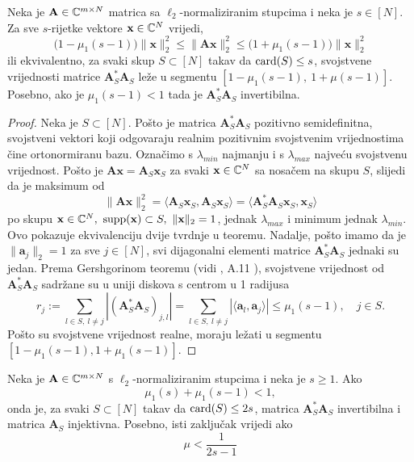 \documentclass[a4paper,twoside,12pt]{memoir} %
\newcommand{\vect}[1]{\mathbf{#1}}
\renewcommand{\vec}{\vect}
\newcommand{\card}{\text{\normalfont{card}}}
\newcommand{\supp}{\text{\normalfont{supp}}}
\newcommand{\norm}[1]{\|{#1}\|}
\begin{document}
\begin{thm}\label{tm:5:3}
    Neka je $\vec A \in \C^{m \times N}$ matrica sa $\ell_2$-normaliziranim stupcima i neka je $s \in [N]$. Za sve $s$-rijetke vektore $\vec x \in \C^N$ vrijedi,
    \begin{equation*}
        \big(1-\mu_1(s-1)\big) \norm{\vec x}_2^2 \leq \norm{\vec{Ax}}_2^2 \leq \big(1+\mu_1(s-1)\big) \norm{\vec x}_2^2
    \end{equation*}
    ili ekvivalentno, za svaki skup $S \subset [N]$ takav da $\card(S) \leq s$, svojstvene vrijednosti matrice $\vec A^*_S \vec A_S$ le\v{z}e u segmentu $[1-\mu_1(s-1),\ 1+\mu(s-1)]$. Posebno, ako je $\mu_1(s-1) < 1$ tada je $\vec A^*_S \vec A_S$ invertibilna.
\end{thm}
\begin{proof}
    Neka je $S \subset [N]$. Po\v{s}to je matrica $\vec A^*_S \vec A_S$ pozitivno semidefinitna, svojstveni vektori koji odgovaraju realnim pozitivnim svojstvenim vrijednostima \v{c}ine ortonormiranu bazu. Ozna\v{c}imo s $\lambda_{min}$ najmanju i s $\lambda_{max}$ najve\'cu svojstvenu vrijednost. Po\v{s}to je $\vec{Ax} = \vec A_S \vec x_S$ za svaki $\vec x \in \C^N$ sa nosa\v{c}em na skupu $S$, slijedi da je maksimum od
    \begin{equation*}
        \norm{\vec{Ax}}_2^2 = \langle \vec A_S \vec x_S, \vec A_S \vec x_S  \rangle = \langle \vec A^*_S \vec A_S \vec x_S, \vec x_S \rangle
    \end{equation*}
    po skupu ${\vec x \in \C^N,\ \supp (\vec x) \subset S,\ \norm{\vec x}_2 = 1}$, jednak $\lambda_{max}$ i minimum jednak $\lambda_{min}$. Ovo pokazuje ekvivalenciju dvije tvrdnje u teoremu. Nadalje, po\v{s}to imamo da je $\norm{\vec a_j}_2 = 1$ za sve $j \in [N]$, svi dijagonalni elementi matrice $\vec A^*_S \vec A_S$ jednaki su jedan. Prema Gershgorinom teoremu (vidi \cite{gerschgorin31}, A.11 \cite{foucart13}), svojstvene vrijednost od $\vec A^*_S \vec A_S$ sadr\v{z}ane su u uniji diskova s centrom u 1 radijusa
    \begin{equation*}
        r_j := \sum_{l \in S,\ l \neq j} |(\vec A^*_S \vec A_S)_{j,l}| = \sum_{l \in S,\ l \neq j} |\langle \vec a_l, \vec a_j \rangle| \leq \mu_1 (s-1),\quad j \in S.
    \end{equation*}
    \newpage
    Po\v{s}to su svojstvene vrijednost realne, moraju le\v{z}ati u segmentu $[1-\mu_1(s-1), 1+ \mu_1(s-1)]$.
\end{proof}
\begin{cor}\label{kor:5:4}
    Neka je $\vec A \in \C^{m \times N}$ s $\ell_2$-normaliziranim stupcima i neka je $s \geq 1$. Ako  
    \begin{equation*}
        \mu_1(s) + \mu_1(s-1) < 1, 
    \end{equation*}
    onda je, za svaki $S \subset [N]$ takav da $\card(S) \leq 2s$, matrica $\vec A^*_S \vec A_S$ invertibilna i matrica $\vec A_S$ injektivna. Posebno, isti zaklju\v{c}ak vrijedi ako
    \begin{equation*}
        \mu < \frac{1}{2s - 1}  
    \end{equation*}
\end{cor}
\end{document}

